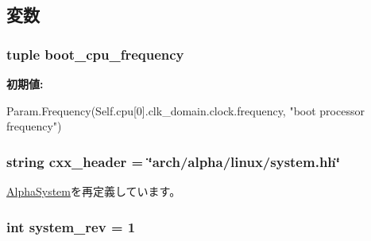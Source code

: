 \subsection{変数}
\hypertarget{classAlphaSystem_1_1LinuxAlphaSystem_aab5259ecbb88c819a4bf9bd03c47b3d9}{
\subsubsection[{boot\_\-cpu\_\-frequency}]{\setlength{\rightskip}{0pt plus 5cm}tuple boot\_\-cpu\_\-frequency}}
\label{classAlphaSystem_1_1LinuxAlphaSystem_aab5259ecbb88c819a4bf9bd03c47b3d9}
{\bfseries 初期値:}
\begin{DoxyCode}
Param.Frequency(Self.cpu[0].clk_domain.clock.frequency,
                                         "boot processor frequency")
\end{DoxyCode}
\hypertarget{classAlphaSystem_1_1LinuxAlphaSystem_a17da7064bc5c518791f0c891eff05fda}{
\subsubsection[{cxx\_\-header}]{\setlength{\rightskip}{0pt plus 5cm}string cxx\_\-header = \char`\"{}arch/alpha/linux/system.hh\char`\"{}}}
\label{classAlphaSystem_1_1LinuxAlphaSystem_a17da7064bc5c518791f0c891eff05fda}


\hyperlink{classAlphaSystem_1_1AlphaSystem_a17da7064bc5c518791f0c891eff05fda}{AlphaSystem}を再定義しています。\hypertarget{classAlphaSystem_1_1LinuxAlphaSystem_a261e4081ddd1f0823eccc0f042086c27}{
\subsubsection[{system\_\-rev}]{\setlength{\rightskip}{0pt plus 5cm}int system\_\-rev = 1}}
\label{classAlphaSystem_1_1LinuxAlphaSystem_a261e4081ddd1f0823eccc0f042086c27}


